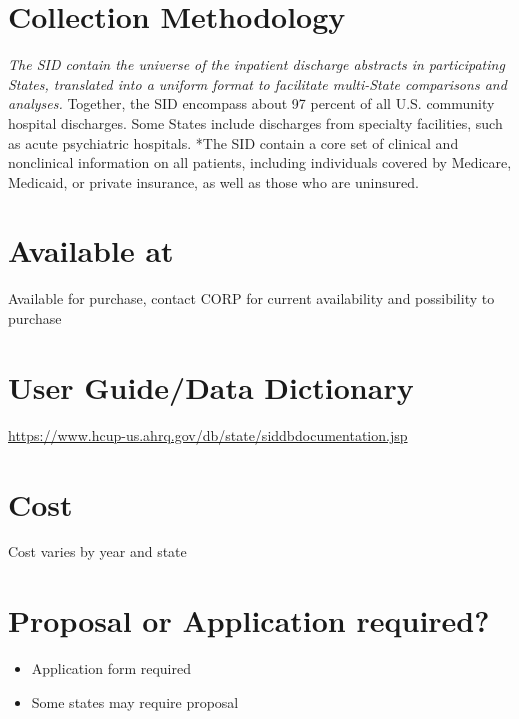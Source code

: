 \documentclass[
]{book}
\providecommand{\tightlist}{%
  \setlength{\itemsep}{0pt}\setlength{\parskip}{0pt}}
\begin{document}
\hypertarget{collection-methodology-84}{%
\section{Collection Methodology}\label{collection-methodology-84}}

\emph{The SID contain the universe of the inpatient discharge abstracts in participating States, translated into a uniform format to facilitate multi-State comparisons and analyses.
}Together, the SID encompass about 97 percent of all U.S. community hospital discharges. Some States include discharges from specialty facilities, such as acute psychiatric hospitals.
*The SID contain a core set of clinical and nonclinical information on all patients, including individuals covered by Medicare, Medicaid, or private insurance, as well as those who are uninsured.

\hypertarget{available-at-84}{%
\section{Available at}\label{available-at-84}}

Available for purchase, contact CORP for current availability and possibility to purchase

\hypertarget{user-guidedata-dictionary-84}{%
\section{User Guide/Data Dictionary}\label{user-guidedata-dictionary-84}}

\url{https://www.hcup-us.ahrq.gov/db/state/siddbdocumentation.jsp}

\hypertarget{cost-84}{%
\section{Cost}\label{cost-84}}

Cost varies by year and state

\hypertarget{proposal-or-application-required-84}{%
\section{Proposal or Application required?}\label{proposal-or-application-required-84}}

\begin{itemize}
\tightlist
\item
  Application form required
\item
  Some states may require proposal
\end{itemize}
\end{document}
